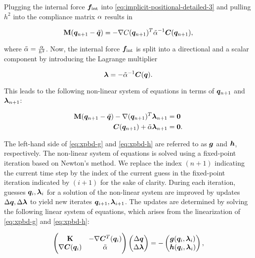 \noindent Plugging the internal force $\bm{f}_{\text{int}}$ into \autoref{eq:implicit-positional-detailed-3} and pulling $h^2$ into the 
compliance matrix $\mathbf{\alpha}$ results in

\[
    \mathbf{M}(\bm{q}_{n+1} - \tilde{\bm{q}}) = - \nabla C(\bm{q}_{n+1})^T \tilde{\mathbf{\alpha}}^{-1} \bm{C}(\bm{q}_{n+1}),
\]

\noindent where $\tilde{\mathbf{\alpha}} = \frac{\mathbf{\alpha}}{h^2}$. Now, the internal force $\bm{f}_{\text{int}}$ is split into a directional 
and a scalar component by introducing the Lagrange multiplier

\begin{equation}\label{eq:lagrange-multiplier}
    \bm{\lambda} = -\tilde{\mathbf{\alpha}}^{-1}\bm{C}(\bm{q}).
\end{equation}

\noindent This leads to the following non-linear system of equations in terms of $\bm{q}_{n+1}$ and $\bm{\lambda}_{n+1}$:

\begin{align}
    \mathbf{M}(\bm{q}_{n+1} - \tilde{\bm{q}}) - \nabla (\bm{q}_{n+1})^T \bm{\lambda}_{n+1} &= \bm{0} \label{eq:xpbd-g} \\
    \bm{C}(\bm{q}_{n+1}) + \tilde{\mathbf{\alpha}}\bm{\lambda}_{n+1} &= \bm{0} \label{eq:xpbd-h}.
\end{align}

\noindent The left-hand side of \autoref{eq:xpbd-g} and \autoref{eq:xpbd-h} are referred to as $\bm{g}$ and $\bm{h}$, respectively. The non-linear 
system of equations is solved using a fixed-point iteration based on Newton's method. We replace the index $(n+1)$ indicating the current
time step by the index of the current guess in the fixed-point iteration indicated by $(i+1)$ for the sake of clarity. During each iteration, 
guesses $\bm{q}_i, \bm{\lambda}_i$ for a solution of the non-linear system are improved by updates $\Delta \bm{q}, \Delta \bm{\lambda}$ to 
yield new iterates $\bm{q}_{i+1}, \bm{\lambda}_{i+1}$. The updates are determined by solving the following linear system of equations, 
which arises from the linearization of \autoref{eq:xpbd-g} and \autoref{eq:xpbd-h}:

\begin{equation}\label{eq:xpbd-lse}
    \begin{pmatrix}
        \mathbf{K} & -\nabla\bm{C}^T(\bm{q}_i)\\
        \nabla\bm{C}(\bm{q}_i) & \tilde{\mathbf{\alpha}}
    \end{pmatrix}
    \begin{pmatrix}
        \Delta \bm{q} \\
        \Delta \bm{\lambda}
    \end{pmatrix}
    = -
    \begin{pmatrix}
    \bm{g}(\bm{q}_i, \bm{\lambda}_i) \\
    \bm{h}(\bm{q}_i, \bm{\lambda}_i)
    \end{pmatrix},
\end{equation}

